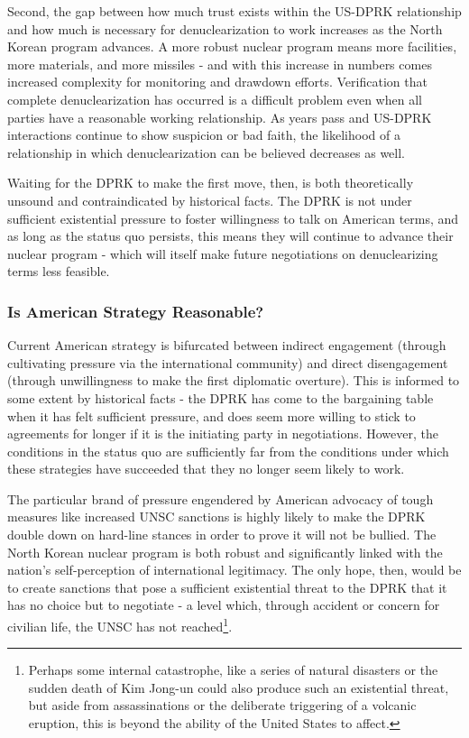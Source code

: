 \documentclass{article}
\begin{document}
Second, the gap between how much trust exists within the US-DPRK relationship and how much is necessary for denuclearization to work increases as the North Korean program advances. A more robust nuclear program means more facilities, more materials, and more missiles - and with this increase in numbers comes increased complexity for monitoring and drawdown efforts. Verification that complete denuclearization has occurred is a difficult problem even when all parties have a reasonable working relationship. As years pass and US-DPRK interactions continue to show suspicion or bad faith, the likelihood of a relationship in which denuclearization can be believed decreases as well.

Waiting for the DPRK to make the first move, then, is both theoretically unsound and contraindicated by historical facts. The DPRK is not under sufficient existential pressure to foster willingness to talk on American terms, and as long as the status quo persists, this means they will continue to advance their nuclear program - which will itself make future negotiations on denuclearizing terms less feasible.

\subsubsection{Is American Strategy Reasonable?}

Current American strategy is bifurcated between indirect engagement (through cultivating pressure via the international community) and direct disengagement (through unwillingness to make the first diplomatic overture). This is informed to some extent by historical facts - the DPRK has come to the bargaining table when it has felt sufficient pressure, and does seem more willing to stick to agreements for longer if it is the initiating party in negotiations. However, the conditions in the status quo are sufficiently far from the conditions under which these strategies have succeeded that they no longer seem likely to work.

The particular brand of pressure engendered by American advocacy of tough measures like increased UNSC sanctions is highly likely to make the DPRK double down on hard-line stances in order to prove it will not be bullied. The North Korean nuclear program is both robust and significantly linked with the nation's self-perception of international legitimacy. The only hope, then, would be to create sanctions that pose a sufficient existential threat to the DPRK that it has no choice but to negotiate - a level which, through accident or concern for civilian life, the UNSC has not reached\footnote{Perhaps some internal catastrophe, like a series of natural disasters or the sudden death of Kim Jong-un could also produce such an existential threat, but aside from assassinations or the deliberate triggering of a volcanic eruption, this is beyond the ability of the United States to affect.}. 
\end{document}
